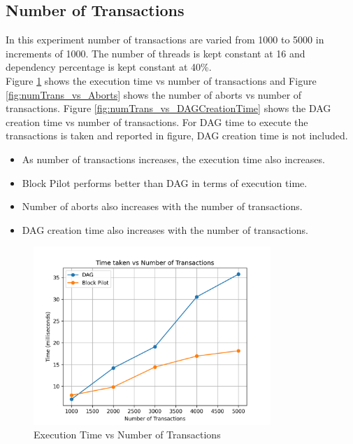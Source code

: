 \documentclass[12pt]{article}
\begin{document}
\subsection{Number of Transactions}
In this experiment number of transactions are varied from 1000 to 5000 in increments of 1000. 
The number of threads is kept constant at 16 and dependency percentage is kept constant at 40\%. \\
Figure \ref{fig:numTrans_vs_Time} shows the execution time vs number of transactions and Figure \ref{fig:numTrans_vs_Aborts} shows the number of aborts vs number of transactions.
Figure \ref{fig:numTrans_vs_DAGCreationTime} shows the DAG creation time vs number of transactions.
For DAG time to execute the transactions is taken and reported in figure, DAG creation time is not included. 
\begin{itemize}
    \item As number of transactions increases, the execution time also increases.
    \item Block Pilot performs better than DAG in terms of execution time.
    \item Number of aborts also increases with the number of transactions.
    \item DAG creation time also increases with the number of transactions.
\end{itemize}

\begin{figure}[h]
    \centering
    \includegraphics[width=0.8\textwidth]{images/numTrans_vs_Time.png}
    \caption{Execution Time vs Number of Transactions}
    \label{fig:numTrans_vs_Time}
\end{figure}
\end{document}
